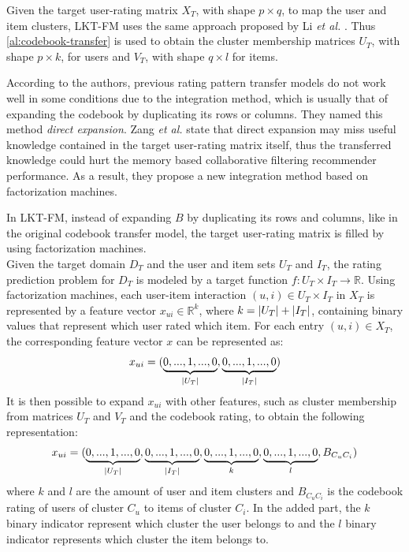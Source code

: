 Given the target user-rating matrix $X_T$, with shape $p \times q$, to map the user and item clusters, LKT-FM uses the same approach proposed by Li \textit{et al.} \cite{10.5555/1661445.1661773}. Thus \autoref{al:codebook-transfer} is used to obtain the cluster membership matrices $U_T$, with shape $p \times k$, for users and $V_T$, with shape $q \times l$ for items.\par
According to the authors, previous rating pattern transfer models do not work well in some conditions due to the integration method, which is usually that of expanding the codebook by duplicating its rows or columns. They named this method \textit{direct expansion}. Zang \textit{et al.} state that direct expansion may miss useful knowledge contained in the target user-rating matrix itself, thus the transferred knowledge could hurt the memory based collaborative filtering recommender performance. As a result, they propose a new integration method based on factorization machines.\par
In LKT-FM, instead of expanding $B$ by duplicating its rows and columns, like in the original codebook transfer model, the target user-rating matrix is filled by using factorization machines.\\
Given the target domain $D_T$ and the user and item sets $U_T$ and $I_T$, the rating prediction problem for $D_T$ is modeled by a target function $f: U_T \times I_T \rightarrow \mathbb{R}$. Using factorization machines, each user-item interaction $(u,i) \in U_T \times I_T$ in $X_T$ is represented by a feature vector $x_{ui} \in \mathbb{R}^k$, where $k = \left\lvert U_T\right\rvert + \left\lvert I_T\right\rvert$, containing binary values that represent which user rated which item. For each entry $(u,i) \in X_T$, the corresponding feature vector $x$ can be represented as:
\begin{equation}
x_{ui} = (\underbrace{0,...,1,...,0}_{\left\lvert U_T\right\rvert},\underbrace{0,...,1,...,0}_{\left\lvert I_T\right\rvert})
\end{equation}
It is then possible to expand $x_{ui}$ with other features, such as cluster membership from matrices $U_T$ and $V_T$ and the codebook rating, to obtain the following representation:
\begin{equation}
x_{ui} = (\underbrace{0,...,1,...,0}_{\left\lvert U_T\right\rvert},\underbrace{0,...,1,...,0}_{\left\lvert I_T\right\rvert},\underbrace{0,...,1,...,0}_{k},\underbrace{0,...,1,...,0}_{l},B_{C_uC_i})
\end{equation}
where $k$ and $l$ are the amount of user and item clusters and $B_{C_uC_i}$ is the codebook rating of users of cluster $C_u$ to items of cluster $C_i$. In the added part, the $k$ binary indicator represent which cluster the user belongs to and the $l$ binary indicator represents which cluster the item belongs to.\\
